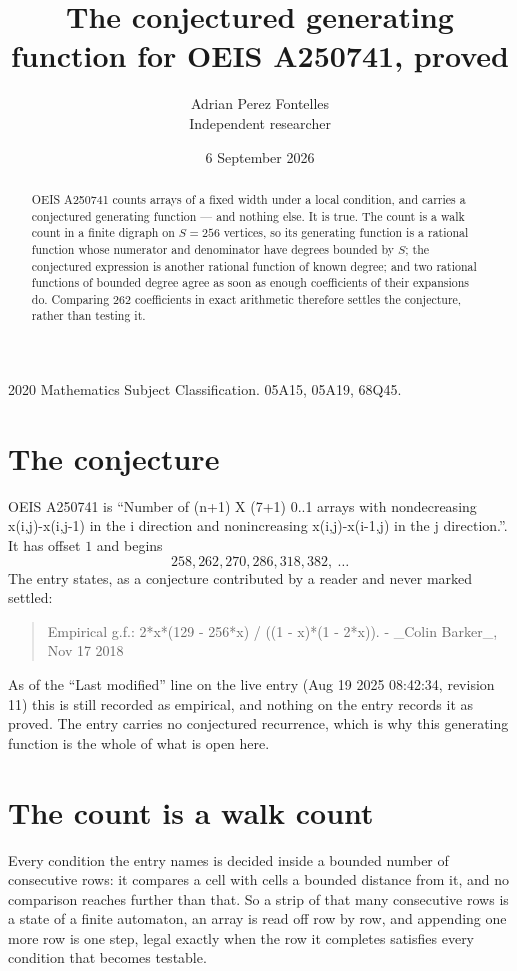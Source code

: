 \documentclass[11pt,a4paper]{article}
\title{The conjectured generating function for OEIS A250741, proved}
\author{Adrian Perez Fontelles\\ \small Independent researcher}
\date{6 September 2026}
\theoremstyle{plain}
\theoremstyle{definition}
\begin{document}
\maketitle

\begin{abstract}
OEIS A250741 counts arrays of a fixed width under a local condition, and carries a conjectured
generating function --- and nothing else. It is true. The count is a walk count in a finite
digraph on $S=256$ vertices, so its generating function is a rational function whose numerator
and denominator have degrees bounded by $S$; the conjectured expression is another rational
function of known degree; and two rational functions of bounded degree agree as soon as enough
coefficients of their expansions do. Comparing $262$ coefficients in exact arithmetic
therefore settles the conjecture, rather than testing it.
\end{abstract}

\noindent\small 2020 Mathematics Subject Classification. 05A15, 05A19, 68Q45.\normalsize

\section{The conjecture}

OEIS A250741 is ``Number of (n+1) X (7+1) 0..1 arrays with nondecreasing x(i,j)-x(i,j-1) in the i direction and nonincreasing x(i,j)-x(i-1,j) in the j direction.''. It has offset $1$ and begins
\[
258, 262, 270, 286, 318, 382,\ \dots
\]
The entry states, as a conjecture contributed by a reader and never marked settled:
\begin{quote}
Empirical g.f.: 2*x*(129 - 256*x) / ((1 - x)*(1 - 2*x)). - \_Colin Barker\_, Nov 17 2018
\end{quote}
As of the ``Last modified'' line on the live entry (Aug 19 2025 08:42:34, revision 11) this is still
recorded as empirical, and nothing on the entry records it as proved. The entry carries no
conjectured recurrence, which is why this generating function is the whole of what is open
here.

\section{The count is a walk count}

Every condition the entry names is decided inside a bounded number of consecutive rows: it
compares a cell with cells a bounded distance from it, and no comparison reaches further than
that. So a strip of that many consecutive rows is a state of a finite automaton, an array is
read off row by row, and appending one more row is one step, legal exactly when the row it
completes satisfies every condition that becomes testable.
\end{document}
